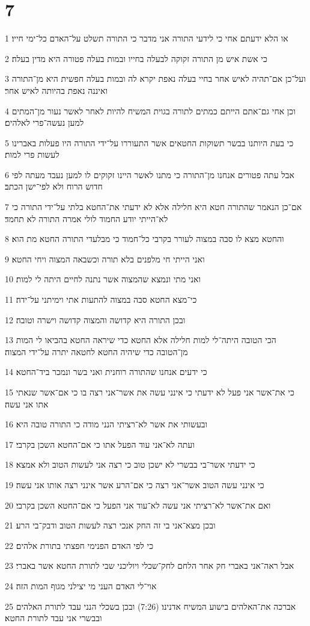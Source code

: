 \chapter{7}

\par 1 או הלא ידעתם אחי כי לידעי התורה אני מדבר כי התורה תשלט על־האדם כל־ימי חייו׃
\par 2 כי אשת איש מן התורה זקוקה לבעלה בחייו ובמות בעלה פטורה היא מדין בעלה׃
\par 3 ועל־כן אם־תהיה לאיש אחר בחיי בעלה נאפת יקרא לה ובמות בעלה חפשית היא מן־התורה ואיננה נאפת בהיותה לאיש אחר׃
\par 4 וכן אחי גם־אתם הייתם כמתים לתורה בגוית המשיח להיות לאחר לאשר נעור מן־המתים למען נעשה־פרי לאלהים׃
\par 5 כי בעת היותנו בבשר תשוקות החטאים אשר התעוררו על־ידי התורה היו פעלות באברינו לעשות פרי למות׃
\par 6 אבל עתה פטורים אנחנו מן־התורה כי מתנו לאשר היינו זקוקים לו למען נעבד מעתה לפי חדוש הרוח ולא לפי־ישן הכתב׃
\par 7 אם־כן הנאמר שהתורה חטא היא חלילה אלא לא ידעתי את־החטא בלתי על־ידי התורה כי לא־הייתי יודע החמוד לולי אמרה התורה לא תחמד׃
\par 8 והחטא מצא לו סבה במצוה לעורר בקרבי כל־חמוד כי מבלעדי התורה החטא מת הוא׃
\par 9 ואני הייתי חי מלפנים בלא תורה וכשבאה המצוה ויחי החטא׃
\par 10 ואני מתי ונמצא שהמצוה אשר נתנה לחיים היתה לי למות׃
\par 11 כי־מצא החטא סבה במצוה להתעות אתי וימיתני על־ידה׃
\par 12 ובכן התורה היא קדושה והמצוה קדושה וישרה וטובה׃
\par 13 הכי הטובה היתה־לי למות חלילה אלא החטא כדי שיראה החטא בהביאו לי המות מן־הטובה כדי שיהיה החטא לחטאה יתרה על־ידי המצוה׃
\par 14 כי ידעים אנחנו שהתורה רוחנית ואני בשר ונמכר ביד־החטא׃
\par 15 כי את־אשר אני פעל לא ידעתי כי אינני עשה את אשר־אני רצה בו כי אם־אשר שנאתי אתו אני עשה׃
\par 16 ובעשותי את אשר לא־רציתי הנני מודה כי התורה טובה היא׃
\par 17 ועתה לא־אני עוד הפעל אתו כי אם־החטא השכן בקרבי׃
\par 18 כי ידעתי אשר־בי בבשרי לא ישכן טוב כי רצה אני לעשות הטוב ולא אמצא׃
\par 19 כי אינני עשה הטוב אשר־אני רצה כי אם־הרע אשר אינני רצה אותו אני עשה׃
\par 20 ואם את־אשר לא־רציתי אני עשה לא־עוד אני הפעל כי אם־החטא השכן בקרבי׃
\par 21 ובכן מצא־אני בי זה החק אנכי רצה לעשות הטוב ודבק־בי הרע׃
\par 22 כי לפי האדם הפנימי חפצתי בתורת אלהים׃
\par 23 אבל ראה־אני באברי חק אחר הלחם לחק־שכלי ויוליכני שבי לתורת החטא אשר באברי׃
\par 24 אוי־לי האדם העני מי יצילני מגוף המות הזה׃
\par 25 אברכה את־האלהים בישוע המשיח אדנינו׃ (7:26) ובכן בשכלי הנני עבד לתורת האלהים ובבשרי אני עבד לתורת החטא׃

